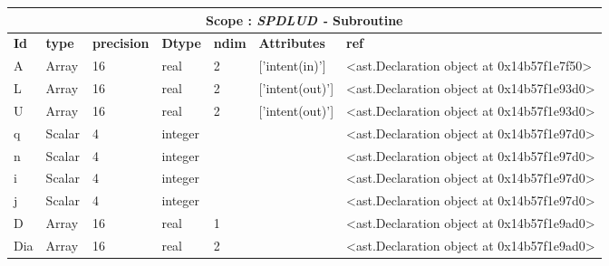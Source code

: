 \documentclass{report}
\begin{document}
\begin{center}
\begin{longtable}{|p{3.5cm}|p{1.5cm}|p{1.5cm}|p{1.5cm}|p{1cm}|p{2cm}|p{4cm}| }
\hline
\multicolumn{7}{|c|}{\textbf{Scope : \qquad}  \textbf{\textit{SPDLUD - }Subroutine}}\\ 
\hline
\textbf{Id} & \textbf{type} & \textbf{precision} & \textbf{Dtype} & \textbf{ndim} & \textbf{Attributes} & \textbf{ref} \\\hline

A & Array & 16 & real & 2 & ['intent(in)'] & <ast.Declaration object at 0x14b57f1e7f50> \\\hline

L & Array & 16 & real & 2 & ['intent(out)'] & <ast.Declaration object at 0x14b57f1e93d0> \\\hline

U & Array & 16 & real & 2 & ['intent(out)'] & <ast.Declaration object at 0x14b57f1e93d0> \\\hline

q & Scalar & 4 & integer &  &  & <ast.Declaration object at 0x14b57f1e97d0> \\\hline

n & Scalar & 4 & integer &  &  & <ast.Declaration object at 0x14b57f1e97d0> \\\hline

i & Scalar & 4 & integer &  &  & <ast.Declaration object at 0x14b57f1e97d0> \\\hline

j & Scalar & 4 & integer &  &  & <ast.Declaration object at 0x14b57f1e97d0> \\\hline

D & Array & 16 & real & 1 &  & <ast.Declaration object at 0x14b57f1e9ad0> \\\hline

Dia & Array & 16 & real & 2 &  & <ast.Declaration object at 0x14b57f1e9ad0> \\\hline

\end{longtable}
\end{center}

 \vspace{1cm}
\end{document}
